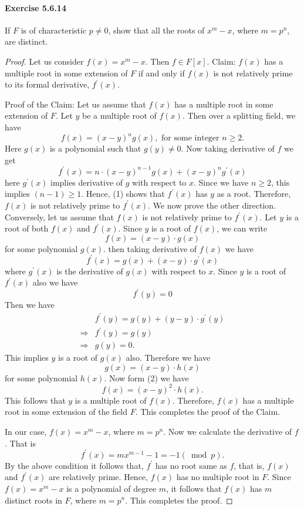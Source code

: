 \documentclass{article}
\begin{document}
\paragraph{Exercise 5.6.14} If $F$ is of characteristic $p \neq 0$, show that all the roots of $x^m - x$, where $m = p^n$, are distinct.
\begin{proof}
    Let us consider $f(x)=x^m-x$. Then $f \in F[x]$.
Claim: $f(x)$ has a multiple root in some extension of $F$ if and only if $f(x)$ is not relatively prime to its formal derivative, $f^{\prime}(x)$. 

Proof of the Claim: Let us assume that $f(x)$ has a multiple root in some extension of $F$. Let $y$ be a multiple root of $f(x)$. Then over a splitting field, we have
$$
f(x)=(x-y)^n g(x), \text { for some integer } n \geq 2 .
$$
Here $g(x)$ is a polynomial such that $g(y) \neq 0$. Now taking derivative of $f$ we get
$$
f^{\prime}(x)=n \cdot(x-y)^{n-1} g(x)+(x-y)^n g^{\prime}(x)
$$
here $g^{\prime}(x)$ implies derivative of $g$ with respect to $x$. Since we have $n \geq 2$, this implies $(n-1) \geq 1$. Hence, (1) shows that $f^{\prime}(x)$ has $y$ as a root. Therefore, $f(x)$ is not relatively prime to $f^{\prime}(x)$. We now prove the other direction.
Conversely, let us assume that $f(x)$ is not relatively prime to $f^{\prime}(x)$. Let $y$ is a root of both $f(x)$ and $f^{\prime}(x)$. Since $y$ is a root of $f(x)$, we can write
$$
f(x)=(x-y) \cdot g(x)
$$
for some polynomial $g(x)$. then taking derivative of $f(x)$ we have
$$
f^{\prime}(x)=g(x)+(x-y) \cdot g^{\prime}(x)
$$
where $g^{\prime}(x)$ is the derivative of $g(x)$ with respect to $x$. Since $y$ is a root of $f^{\prime}(x)$ also we have
$$
f^{\prime}(y)=0
$$
Then we have
$$
\begin{aligned}
& f^{\prime}(y)=g(y)+(y-y) \cdot g^{\prime}(y) \\
\Longrightarrow & f^{\prime}(y)=g(y) \\
\Longrightarrow & g(y)=0 .
\end{aligned}
$$
This implies $y$ is a root of $g(x)$ also. Therefore we have
$$
g(x)=(x-y) \cdot h(x)
$$
for some polynomial $h(x)$. Now form (2) we have
$$
f(x)=(x-y)^2 \cdot h(x) .
$$
This follows that $y$ is a multiple root of $f(x)$. Therefore, $f(x)$ has a multiple root in some extension of the field $F$. This completes the proof of the Claim.

In our case, $f(x)=x^m-x$, where $m=p^n$. Now we calculate the derivative of $f$. That is
$$
f^{\prime}(x)=m x^{m-1}-1=-1(\bmod p) .
$$
By the above condition it follows that, $f^{\prime}$ has no root same as $f$, that is, $f(x)$ and $f^{\prime}(x)$ are relatively prime. Hence, $f(x)$ has no multiple root in $F$. Since $f(x)=x^m-x$ is a polynomial of degree $m$, it follows that $f(x)$ has $m$ distinct roots in $F$, where $m=p^n$. This completes the proof.
\end{proof}
\end{document}
